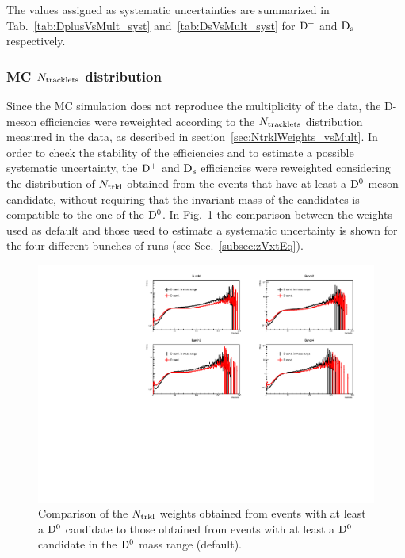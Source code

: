 The values assigned as systematic uncertainties are summarized in Tab.~\ref{tab:DplusVsMult_syst} and~\ref{tab:DsVsMult_syst} for ${\rm D^+}$ and ${\rm D_s}$ respectively.

\subsubsection{MC $N_{\rm tracklets}$ distribution}
Since the MC simulation does not reproduce the multiplicity of the data, the D-meson efficiencies were reweighted according to the $N_{\rm tracklets}$ distribution measured in the data, as described in section~\ref{sec:NtrklWeights_vsMult}. In order to check the stability of the efficiencies and to estimate a possible systematic uncertainty, the ${\rm D^+}$ and ${\rm D_s}$ efficiencies were reweighted considering the distribution of $N_{\rm trkl}$ obtained from the events that have at least a ${\rm D^0}$ meson candidate, without requiring that the invariant mass of the candidates is compatible to the one of the ${\rm D^0}$. In Fig.~\ref{fig:NtrklWeights_EvWithD_EvWithCand_Comparison} the comparison between the weights used as default and those used to estimate a systematic uncertainty is shown for the four different bunches of runs (see Sec.~\ref{subsec:zVxtEq}).

\begin{figure}[htpb]
\centering
 \includegraphics[width=.9\textwidth]{FigCap6/NtrkWeightsD-Cand_4Bunches_DsDplusVsmult.pdf}
 \caption{Comparison of the $N_{\rm trkl}$ weights obtained from events with at least a ${\rm D^0}$ candidate to those obtained from events with at least a ${\rm D^0}$ candidate in the ${\rm D^0}$ mass range (default).}
 \label{fig:NtrklWeights_EvWithD_EvWithCand_Comparison}
\end{figure}

